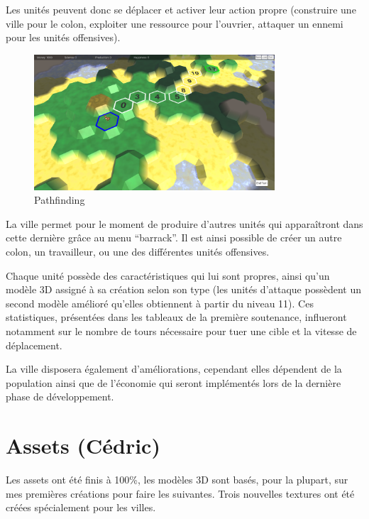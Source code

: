 \documentclass[12pt]{report}
\begin{document}
Les unités peuvent donc se déplacer et activer leur action propre (construire
une ville pour le colon, exploiter une ressource pour l'ouvrier, attaquer un 
ennemi pour les unités offensives).

\begin{figure}[H]
    \centering
    \includegraphics[width=0.8\textwidth]{Pathfinding}
    \caption{Pathfinding}
\end{figure}

La ville permet pour le moment de produire d’autres unités qui apparaîtront
dans cette dernière grâce au menu “barrack”. Il est ainsi possible de créer un
autre colon, un travailleur, ou une des différentes unités offensives.

Chaque unité possède des caractéristiques qui lui sont propres, ainsi qu’un
modèle 3D assigné à sa création selon son type (les unités d’attaque possèdent
un second modèle amélioré qu’elles obtiennent à partir du niveau 11). Ces
statistiques, présentées dans les tableaux de la première soutenance,
influeront notamment sur le nombre de tours nécessaire pour tuer une cible et
la vitesse de déplacement.

La ville disposera également d’améliorations, cependant elles dépendent de la
population ainsi que de l’économie qui seront implémentés lors de la dernière
phase de développement.

\section{Assets (Cédric)}

Les assets ont été finis à 100\%, les modèles 3D sont basés, pour la plupart,
sur mes premières créations pour faire les suivantes. Trois nouvelles textures
ont été créées spécialement pour les villes.
\end{document}
